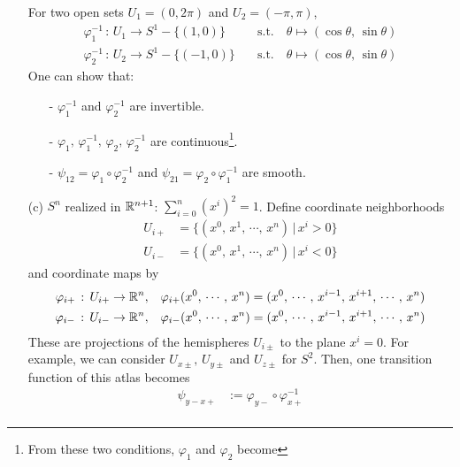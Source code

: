 \documentclass[a4paper, 10pt]{article}
\begin{document}
\begin{example}
\begin{itemize}
        For two open sets $U_{1} = (0, 2\pi)$ and $U_{2} = (-\pi,\pi)$,
        \begin{align*}
            \varphi_{1}^{-1} \,:\, U_{1} \rightarrow S^{1}-\{(1,0)\} &\quad\text{s.t.}\quad \theta \mapsto (\cos\theta,\,\sin\theta) \\
            \varphi_{2}^{-1} \,:\, U_{2} \rightarrow S^{1}-\{(-1,0)\} &\quad\text{s.t.}\quad \theta \mapsto (\cos\theta,\,\sin\theta)
        \end{align*}
        One can show that:
        \begin{itemize}
            \item[-] $\varphi_{1}^{-1}$ and $\varphi_{2}^{-1}$ are invertible.
            \item[-] $\varphi_{1},\,\varphi_{1}^{-1},\,\varphi_{2},\,\varphi_{2}^{-1}$ are continuous\footnote{From these two conditions, $\varphi_{1}$ and $\varphi_{2}$ become }.
            \item[-] $\psi_{12} = \varphi_{1} \circ \varphi_{2}^{-1}$ and $\psi_{21} = \varphi_{2} \circ \varphi_{1}^{-1}$ are smooth.
        \end{itemize}
        \item[(c)] $S^{n}$ realized in $\mathbb{R}^{n+1}$: $\displaystyle{\sum_{i=0}^{n}(x^{i})^{2} = 1}$. Define coordinate neighborhoods
        \begin{align*}
            U_{i+} &= \{ (x^{0},\, x^{1},\, \cdots,\, x^{n}) \,|\, x^{i} > 0\} \\
            U_{i-} &= \{ (x^{0},\, x^{1},\, \cdots,\, x^{n}) \,|\, x^{i} < 0\}
        \end{align*}
        and coordinate maps by
        \begin{align*}
            \varphi_{i+} \,:\, U_{i+} \rightarrow \mathbb{R}^{n}, &\quad \varphi_{i+}(x^{0},\, \cdots,\, x^{n}) = (x^{0},\,\cdots,\,x^{i-1},\,x^{i+1},\,\cdots,\,x^{n}) \\
            \varphi_{i-} \,:\, U_{i-} \rightarrow \mathbb{R}^{n}, &\quad \varphi_{i-}(x^{0},\, \cdots,\, x^{n}) = (x^{0},\,\cdots,\,x^{i-1},\,x^{i+1},\,\cdots,\,x^{n})
        \end{align*}
        These are projections of the hemispheres $U_{i\pm}$ to the plane $x^{i} = 0$. For example, we can consider $U_{x\pm},\,U_{y\pm}$ and $U_{z\pm}$ for $S^{2}$. Then, one transition function of this atlas becomes
        \begin{align*}
            \psi_{y-x+} &:= \varphi_{y-} \circ \varphi_{x+}^{-1} \\

\end{align*}
\end{itemize}
\end{example}
\end{document}
